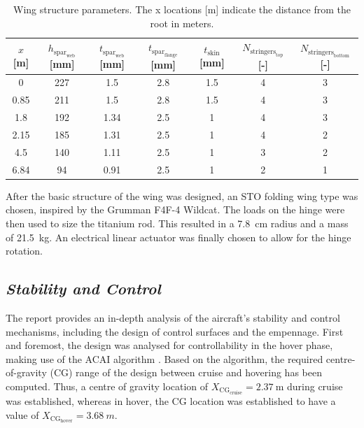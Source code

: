 \begin{table}[H]
    \centering
    \caption{Wing structure parameters. The x locations [m] indicate the distance from the root in meters.}
    \label{tab:finalwingstructure}
    \begin{tabular}{
        S[table-format=1.2]|
        S[table-format=3.0]
        S[table-format=1.2]
        S[table-format=1.1]
        S[table-format=1.1]
        S[table-format=1.0]
        S[table-format=1.0]
    }
        \toprule
         $x$ [\unit{m}] & $h_{\text{spar}_\text{web}}$ [\unit{mm}] & $t_{\text{spar}_\text{web}}$ [\unit{mm}] &  $t_{\text{spar}_\text{flange}}$ [\unit{mm}] & $t_\text{skin}$ [\unit{mm}] & $N_{\text{stringers}_\text{top}}$ [\unit{-}] & $N_{\text{stringers}_\text{bottom}}$  [\unit{-}] \\  & 227 & 1.5     & 2.8 & 1.5 & 4 & 3 \\
        0.85 & 211 & 1.5  & 2.8 & 1.5 & 4 & 3 \\
        1.8 & 192 & 1.34  & 2.5 & 1 & 4 & 3 \\
        2.15 & 185 & 1.31 & 2.5 & 1 & 4 & 2 \\
        4.5 & 140 & 1.11  & 2.5 & 1 & 3 & 2 \\
        6.84 & 94 & 0.91  & 2.5 & 1 & 2 & 1 \\ \bottomrule
    \end{tabular}
    \label{tab:finalwingstructure_transposed}
\end{table}

After the basic structure of the wing was designed, an STO folding wing type was chosen, inspired by the Grumman F4F-4 Wildcat.
The loads on the hinge were then used to size the titanium rod.
This resulted in a \qty{7.8}{\centi\m} radius and a mass of \qty{21.5}{\kg}.
An electrical linear actuator was finally chosen to allow for the hinge rotation.

\subsection*{\textit{Stability and Control}}
The report provides an in-depth analysis of the aircraft’s stability and control mechanisms, including the design of control surfaces and the empennage.
First and foremost, the design was analysed for controllability in the hover phase, making use of the ACAI algorithm \cite{du2015controllability}.
Based on the algorithm, the required centre-of-gravity (CG) range of the design between cruise and hovering has been computed.
Thus, a centre of gravity location of $X_{\text{CG}_{\text{cruise}}}=\qty{2.37}{\m}$ during cruise was established,
whereas in hover, the CG location was established to have a value of $X_{\text{CG}_{\text{hover}}}=\qty{3.68}{m}$.

